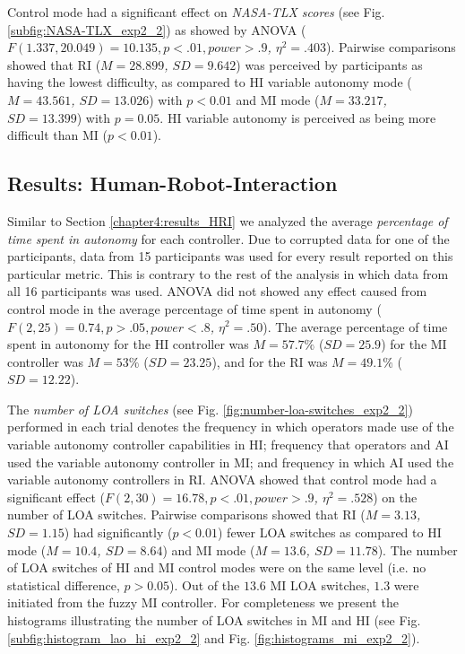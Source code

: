 \documentclass[a4paper,12pt,oneside,openright]{bhamthesis}
\begin{document}
Control mode had a significant effect on \textit{NASA-TLX scores} (see Fig. \ref{subfig:NASA-TLX_exp2_2}) as showed by ANOVA (\textit{$F(1.337, 20.049) = 10.135, p < .01 , power > .9$, $\eta^2 = .403$}). Pairwise comparisons showed that RI (\textit{$M = 28.899$, $SD = 9.642$}) was perceived by participants as having the lowest difficulty, as compared to HI variable autonomy mode (\textit{$M = 43.561$, $SD = 13.026$}) with $p < 0.01$ and MI mode (\textit{$M = 33.217$, $SD = 13.399$}) with $p = 0.05$. HI variable autonomy is perceived as being more difficult than MI ($p < 0.01$). 


\subsection{Results: Human-Robot-Interaction}
\label{chapter5:sim_results_HRI}
Similar to Section \ref{chapter4:results_HRI} we analyzed the average \textit{percentage of time spent in autonomy} for each controller. Due to corrupted data for one of the participants, data from 15 participants was used for every result reported on this particular metric. This is contrary to the rest of the analysis in which data from all 16 participants was used. ANOVA did not showed any effect caused from control mode in the average percentage of time spent in autonomy (\textit{$F(2, 25) = 0.74, p > .05 , power < .8$, $\eta^2 = .50$}). The average percentage of time spent in autonomy for the HI controller was \textit{$M = 57.7\%$} (\textit{$SD = 25.9$}) for the MI controller was \textit{$M = 53\%$} (\textit{$SD = 23.25$}), and for the RI was \textit{$M = 49.1\%$} (\textit{$SD = 12.22$}).

The \textit{number of LOA switches} (see Fig. \ref{fig:number-loa-switches_exp2_2}) performed in each trial denotes the frequency in which operators made use of the variable autonomy controller capabilities in HI; frequency that operators and AI used the variable autonomy controller in MI; and frequency in which AI used the variable autonomy controllers in RI. ANOVA showed that control mode had a significant effect (\textit{$F(2, 30) = 16.78, p < .01 , power > .9$, $\eta^2 = .528$}) on the number of LOA switches. Pairwise comparisons showed that RI (\textit{$M = 3.13$, $SD = 1.15$}) had significantly ($p < 0.01$) fewer LOA switches as compared to HI mode (\textit{$M = 10.4$, $SD = 8.64$}) and MI mode (\textit{$M = 13.6$, $SD = 11.78$}). The number of LOA switches of HI and MI control modes were on the same level (i.e. no statistical difference, $p > 0.05$). Out of the $13.6$ MI LOA switches, $1.3$ were initiated from the fuzzy MI controller. For completeness we present the histograms illustrating the number of LOA switches in MI and HI (see Fig. \ref{subfig:histogram_lao_hi_exp2_2} and Fig. \ref{fig:histograms_mi_exp2_2}).
\end{document}
